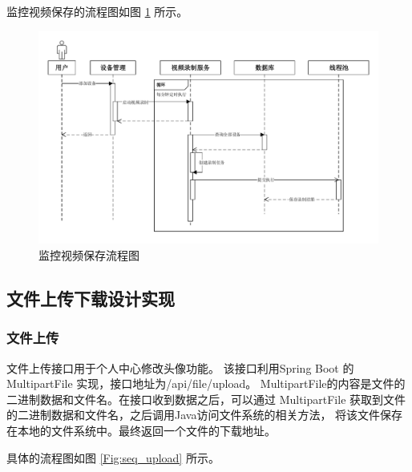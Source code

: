 监控视频保存的流程图如图 \ref{Fig:video_save} 所示。

\begin{figure}[ht]
    \centering
    \includegraphics[width=0.9\linewidth]{./Figure/IMG_video_save.pdf}
    \caption{监控视频保存流程图}\label{Fig:video_save}
\end{figure}

\subsection{文件上传下载设计实现}
\subsubsection{文件上传}
文件上传接口用于个人中心修改头像功能。
该接口利用Spring Boot 的 MultipartFile 实现，接口地址为/api/file/upload。
MultipartFile的内容是文件的二进制数据和文件名。在接口收到数据之后，可以通过 
MultipartFile 获取到文件的二进制数据和文件名，之后调用Java访问文件系统的相关方法，
将该文件保存在本地的文件系统中。最终返回一个文件的下载地址。


具体的流程图如图 \ref{Fig:seq_upload} 所示。

